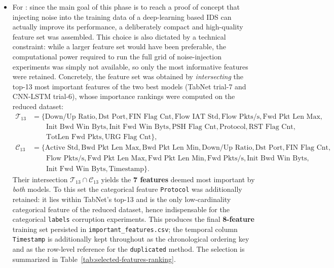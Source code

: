 \documentclass[../main.tex]{subfiles}
\begin{document}
\begin{itemize}
    \item For : since the main goal of this phase is to reach a proof of concept that injecting noise into the training data of a deep-learning based IDS can actually improve its performance, a deliberately compact and high-quality feature set was assembled. This choice is also dictated by a technical constraint: while a larger feature set would have been preferable, the computational power required to run the full grid of noise-injection experiments was simply not available, so only the most informative features were retained. Concretely, the feature set was obtained by \emph{intersecting} the top-13 most important features of the two best models (TabNet trial-7 and CNN-LSTM trial-6), whose importance rankings were computed on the reduced dataset:
    \begin{align*}
        \mathcal{T}_{13} &= \{ \text{Down/Up Ratio}, \text{Dst Port}, \text{FIN Flag Cnt}, \text{Flow IAT Std}, \text{Flow Pkts/s}, \text{Fwd Pkt Len Max}, \\
        &\qquad \text{Init Bwd Win Byts}, \text{Init Fwd Win Byts}, \text{PSH Flag Cnt}, \text{Protocol}, \text{RST Flag Cnt}, \\
        &\qquad \text{TotLen Fwd Pkts}, \text{URG Flag Cnt} \}, \\
        \mathcal{C}_{13} &= \{ \text{Active Std}, \text{Bwd Pkt Len Max}, \text{Bwd Pkt Len Min}, \text{Down/Up Ratio}, \text{Dst Port}, \text{FIN Flag Cnt}, \\
        &\qquad \text{Flow Pkts/s}, \text{Fwd Pkt Len Max}, \text{Fwd Pkt Len Min}, \text{Fwd Pkts/s}, \text{Init Bwd Win Byts}, \\
        &\qquad \text{Init Fwd Win Byts}, \text{Timestamp} \}.
    \end{align*}
    Their intersection $\mathcal{T}_{13} \cap \mathcal{C}_{13}$ yields the \textbf{7 features} deemed most important by \emph{both} models. To this set the categorical feature \texttt{Protocol} was additionally retained: it lies within TabNet's top-13 and is the only low-cardinality categorical feature of the reduced dataset, hence indispensable for the categorical \texttt{labels} corruption experiments. This produces the final \textbf{8-feature} training set persisted in \texttt{important\_features.csv}; the temporal column \texttt{Timestamp} is additionally kept throughout as the chronological ordering key and as the row-level reference for the \texttt{duplicated} method. The selection is summarized in Table~\ref{tab:selected-features-ranking}.

\end{itemize}
\end{document}
